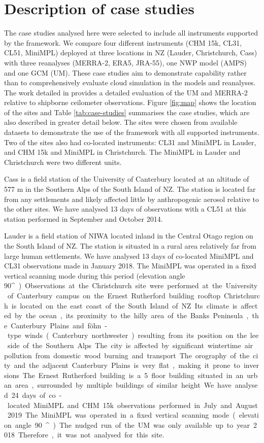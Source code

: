 \section{Description of case studies}
\label{sec:case-studies}

The case studies analysed here were selected
to include all instruments supported by the framework. We compare four different
instruments (CHM 15k, CL31, CL51, MiniMPL) deployed at three locations in NZ
(Lauder, Christchurch, Cass) with three reanalyses (MERRA-2, ERA5, JRA-55),
one NWP model (AMPS) and one GCM (UM).
These case studies aim to demonstrate capability rather than to comprehensively evaluate cloud simulation in the
models and reanalyses. The work detailed in \cite{kuma2020a} provides a detailed evaluation of the UM and MERRA-2 relative to shipborne ceilometer observations.
Figure \ref{fig:map} shows the location of the sites and Table \ref{tab:case-studies}
summarises the case studies, which are also described in greater detail below.
The sites were chosen from available datasets to demonstrate the use of the
framework with all supported instruments. Two of the sites also had co-located
instruments: CL31 and MiniMPL in Lauder, and CHM 15k and MiniMPL in
Christchurch. The MiniMPL in Lauder and Christchurch were two different units.

Cass is a field station of the University of Canterbury
located at an altitude of 577 m in the Southern Alps
of the South Island of NZ. The station is located far from any 
settlements and likely affected little by anthropogenic aerosol relative to the
other sites. We have analysed
13 days of observations with a CL51 at this station performed in September
and October 2014.

Lauder is a field station of NIWA located
inland in the Central Otago region on the South Island of NZ.
The station is situated in a rural area relatively far from large human
settlements. We have analysed 13 days of co-located MiniMPL and CL31
observations made in January 2018. The MiniMPL was operated in a fixed
vertical scanning mode during this period (elevation angle 90\unit{^\circ}).

Observations at the Christchurch site were performed at the
University of Canterbury campus on the Ernest Rutherford building rooftop.
Christchurch is located on the east coast of the South Island of NZ.
Its climate is affected by the ocean, its proximity to the hilly area
of the Banks Peninsula, the Canterbury Plains and föhn-type winds (Canterbury northwester)
resulting from its position on the lee side of the Southern Alps. The city is affected by
significant wintertime air pollution from domestic wood burning and transport.
The orography of the city and the adjacent Canterbury Plains is very flat,
making it prone to inversions. The Ernest Rutherford building is a 5 floor
building situated in an urban area, surrounded by multiple buildings of similar
height. We have analysed 24 days of co-located MiniMPL and CHM 15k observations
performed in July and August 2019. The MiniMPL was operated in a fixed vertical
scanning mode (elevation angle 90\unit{^\circ}).
The nudged run of the UM was only available up to year 2018. Therefore,
it was not analysed for this site.

